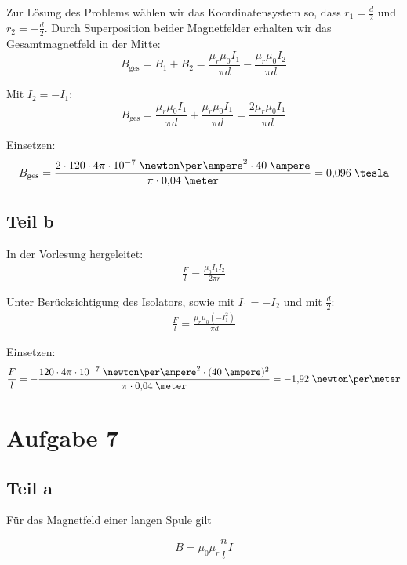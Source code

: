 \documentclass[a4paper,german,12pt,smallheadings]{scrartcl}
\begin{document}
Zur Lösung des Problems wählen wir das Koordinatensystem so, dass
$r_1=\frac{d}{2}$ und $r_2=-\frac{d}{2}$. Durch Superposition beider
Magnetfelder erhalten wir das Gesamtmagnetfeld in der Mitte:
\begin{equation*}
B_{\text{ges}}=B_1+B_2= \frac{\mu_r \mu_0 I_1}{\pi d}- \frac{\mu_r \mu_0 I_2}{\pi d}
\end{equation*}

Mit $I_2=-I_1$:
\begin{equation*}
B_{\text{ges}}=\frac{\mu_r \mu_0 I_1}{\pi d}+ \frac{\mu_r \mu_0 I_1}{\pi d}=\frac{2\mu_r \mu_0 I_1}{\pi d}
\end{equation*}

Einsetzen:
\begin{equation*}
B_{\text{ges}}=\frac{2\cdot 120 \cdot 4\pi \cdot 10^{-7} \;\newton\per\ampere^2 \cdot 40 \;\ampere}{\pi \cdot 0{,}04 \;\meter} = 0{,}096 \;\tesla
\end{equation*}

\subsection*{Teil b}

In der Vorlesung hergeleitet:
\begin{align*}
\frac{F}{l}=\frac{\mu_0 I_1 I_2}{2 \pi r}
\end{align*}

Unter Berücksichtigung des Isolators, sowie mit $I_1=-I_2$ und  mit $\frac{d}{2}$:
\begin{align*}
\frac{F}{l}=\frac{\mu_r \mu_0 (-I_1^2)}{\pi d}
\end{align*}

Einsetzen:
\begin{align*}
\frac{F}{l}=-\frac{120 \cdot 4\pi \cdot 10^{-7} \;\newton\per\ampere^2 \cdot (40 \;\ampere)^2}{\pi \cdot 0{,}04 \;\meter} = -1{,}92 \;\newton\per\meter
\end{align*}

\section*{Aufgabe 7}
\subsection*{Teil a}
Für das Magnetfeld einer langen Spule gilt

\begin{equation*}
  B = \mu_0 \mu_r \frac{n}{l} I
\end{equation*}
\end{document}
